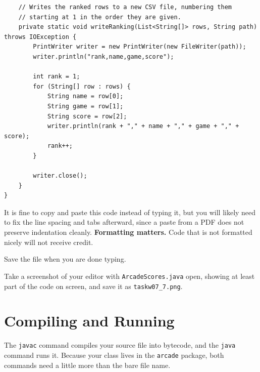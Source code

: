\documentclass[11pt]{article}
\begin{document}
\begin{lstlisting}
    // Writes the ranked rows to a new CSV file, numbering them
    // starting at 1 in the order they are given.
    private static void writeRanking(List<String[]> rows, String path) throws IOException {
        PrintWriter writer = new PrintWriter(new FileWriter(path));
        writer.println("rank,name,game,score");

        int rank = 1;
        for (String[] row : rows) {
            String name = row[0];
            String game = row[1];
            String score = row[2];
            writer.println(rank + "," + name + "," + game + "," + score);
            rank++;
        }

        writer.close();
    }
}
\end{lstlisting}

It is fine to copy and paste this code instead of typing it, but you will
likely need to fix the line spacing and tabs afterward, since a paste from a
PDF does not preserve indentation cleanly.
\textbf{\color{coaNavy}Formatting matters.} Code that is not formatted nicely
will not receive credit.

Save the file when you are done typing.

Take a screenshot of your editor with \texttt{ArcadeScores.java} open,
showing at least part of the code on screen, and save it as
\texttt{taskw07\_7.png}.

\section{Compiling and Running}

The \texttt{javac} command compiles your source file into bytecode, and the
\texttt{java} command runs it. Because your class lives in the
\texttt{arcade} package, both commands need a little more than the bare file
name.
\end{document}
